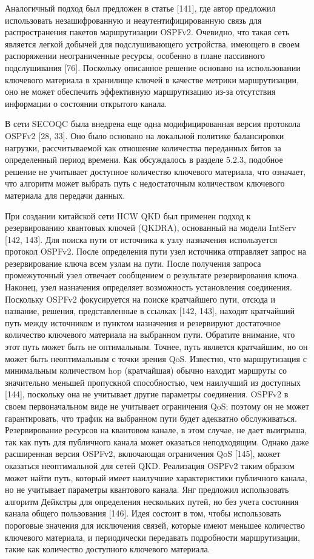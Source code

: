 Аналогичный подход был предложен в статье [141], где автор предложил использовать незашифрованную и неаутентифицированную связь для распространения пакетов маршрутизации OSPFv2. Очевидно, что такая сеть является легкой добычей для подслушивающего устройства, имеющего в своем распоряжении неограниченные ресурсы, особенно в плане пассивного подслушивания [76]. Поскольку описанное решение основано на использовании ключевого материала в хранилище ключей в качестве метрики маршрутизации, оно не может обеспечить эффективную маршрутизацию из-за отсутствия информации о состоянии открытого канала.

В сети SECOQC была внедрена еще одна модифицированная версия протокола OSPFv2 [28,
33]. Оно было основано на локальной политике балансировки нагрузки, рассчитываемой как отношение количества переданных битов за определенный период времени. Как обсуждалось в разделе 5.2.3, подобное решение не учитывает доступное количество ключевого материала, что означает, что алгоритм может выбрать путь с недостаточным количеством ключевого материала для передачи данных.

При создании китайской сети HCW QKD был применен подход к резервированию квантовых ключей (QKDRA), основанный на модели IntServ [142, 143]. Для поиска пути от источника к узлу назначения используется протокол OSPFv2. После определения пути узел источника отправляет запрос на резервирование ключа всем узлам на пути. После получения запроса промежуточный узел отвечает сообщением о результате резервирования ключа. Наконец, узел назначения определяет возможность установления соединения. Поскольку OSPFv2 фокусируется на поиске кратчайшего пути, отсюда и название, решения, представленные в ссылках [142, 143], находят кратчайший путь между источником и пунктом назначения и резервируют достаточное количество ключевого материала на выбранном пути. Обратите внимание, что этот путь может быть не оптимальным. Точнее, путь является кратчайшим, но он может быть неоптимальным с точки зрения QoS. Известно, что маршрутизация с минимальным количеством hop (кратчайшая) обычно находит маршруты со значительно меньшей пропускной способностью, чем наилучший из доступных [144], поскольку она не учитывает другие параметры соединения. OSPFv2 в своем первоначальном виде не учитывает ограничения QoS; поэтому он не может гарантировать, что трафик на выбранном пути будет адекватно обслуживаться. Резервирование ресурсов на квантовом канале, в этом случае, не дает выигрыша, так как путь для публичного канала может оказаться неподходящим. Однако даже расширенная версия OSPFv2, включающая ограничения QoS [145], может оказаться неоптимальной для сетей QKD. Реализация OSPFv2 таким образом может найти путь, который имеет наилучшие характеристики публичного канала, но не учитывает параметры квантового канала.
Янг предложил использовать алгоритм Дейкстры для определения нескольких путей, но без учета состояния канала общего пользования [146]. Идея состоит в том, чтобы использовать пороговые значения для исключения связей, которые имеют меньшее количество ключевого материала, и периодически передавать подробности маршрутизации, такие как количество доступного ключевого материала.

